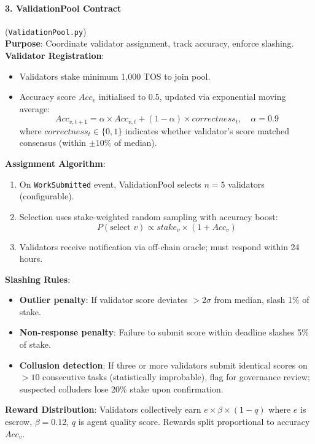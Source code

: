 \documentclass[11pt]{article}
\begin{document}
\paragraph{3. ValidationPool Contract} (\texttt{ValidationPool.py})\\
\textbf{Purpose}: Coordinate validator assignment, track accuracy, enforce slashing.\\
\textbf{Validator Registration}:
\begin{itemize}[noitemsep]
  \item Validators stake minimum 1,000 TOS to join pool.
  \item Accuracy score $Acc_v$ initialised to 0.5, updated via exponential moving average:
    \begin{equation}
    Acc_{v,t+1} = \alpha \times Acc_{v,t} + (1-\alpha) \times correctness_t, \quad \alpha = 0.9
    \end{equation}
    where $correctness_t \in \{0,1\}$ indicates whether validator's score matched consensus (within $\pm10\%$ of median).
\end{itemize}
\textbf{Assignment Algorithm}:
\begin{enumerate}[noitemsep]
  \item On \texttt{WorkSubmitted} event, ValidationPool selects $n=5$ validators (configurable).
  \item Selection uses stake-weighted random sampling with accuracy boost:
    \begin{equation}
    P(\text{select } v) \propto stake_v \times (1 + Acc_v)
    \end{equation}
  \item Validators receive notification via off-chain oracle; must respond within 24 hours.
\end{enumerate}
\textbf{Slashing Rules}:
\begin{itemize}[noitemsep]
  \item \textbf{Outlier penalty}: If validator score deviates $>2\sigma$ from median, slash 1\% of stake.
  \item \textbf{Non-response penalty}: Failure to submit score within deadline slashes 5\% of stake.
  \item \textbf{Collusion detection}: If three or more validators submit identical scores on $>10$ consecutive tasks (statistically improbable), flag for governance review; suspected colluders lose 20\% stake upon confirmation.
\end{itemize}
\textbf{Reward Distribution}: Validators collectively earn $e \times \beta \times (1-q)$ where $e$ is escrow, $\beta=0.12$, $q$ is agent quality score. Rewards split proportional to accuracy $Acc_v$.
\end{document}
